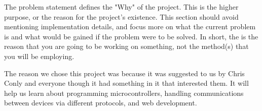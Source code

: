 The problem statement defines the "Why" of the project. This is the higher purpose, or the reason for the project's existence. This section should avoid mentioning implementation details, and focus more on what the current problem is and what would be gained if the problem were to be solved. In short, the is the reason that you are going to be working on something, not the method(s) that you will be employing.

\vspace{5mm}

The reason we chose this project was because it was suggested to us by Chris Conly and everyone though it had something in it that interested them. It will help us learn about programming microcontrollers, handling communications between devices via different protocols, and web development.  


